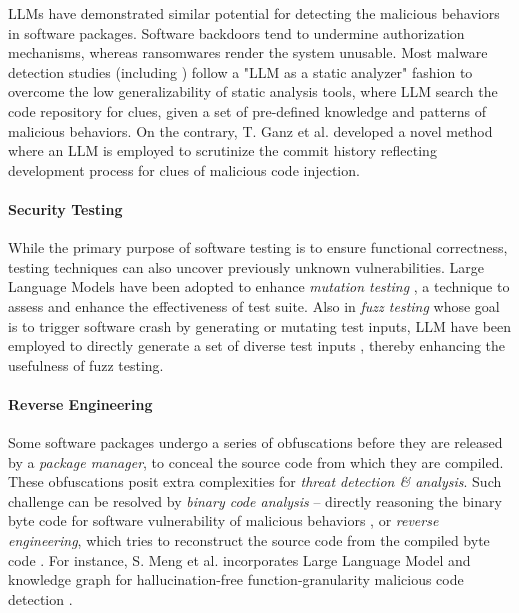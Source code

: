 \par LLMs have demonstrated similar potential for detecting the malicious behaviors
in software packages. Software backdoors tend to undermine authorization mechanisms,
whereas ransomwares render the system unusable. Most malware detection studies
(including \cite{10.1145/3705304, 10695665, 11029752})
follow a "LLM as a static analyzer" fashion to overcome the low generalizability
of static analysis tools, where LLM search the code repository
for clues, given a set of pre-defined knowledge and patterns of malicious behaviors.
On the contrary, T. Ganz et al. developed a novel method where an LLM is
employed to scrutinize the commit history reflecting development process for clues
of malicious code injection\citep{10.1145/3577923.3583657}.

\paragraph*{Security Testing}
While the primary purpose of software testing is to ensure functional correctness,
testing techniques can also uncover previously unknown vulnerabilities.
Large Language Models have been adopted to enhance \textit{mutation testing} 
\citep{10.1145/3756681.3756991}, a technique to assess and enhance the
effectiveness of test suite. Also in \textit{fuzz testing} whose goal
is to trigger software crash by generating or mutating test inputs,
LLM have been employed to directly generate a set of diverse test inputs
\citep{fuzz4all}, thereby enhancing the usefulness of fuzz testing. 

\paragraph*{Reverse Engineering}
Some software packages undergo a series of obfuscations before they are released
by a \textit{package manager}, to conceal the source code from which
they are compiled. These obfuscations posit extra complexities for
\textit{threat detection \& analysis}. Such challenge can be resolved
by \textit{binary code analysis} -- directly reasoning the binary byte code
for software vulnerability of malicious behaviors \citep{11519107}, 
or \textit{reverse engineering},
which tries to reconstruct the source code from the compiled byte code
\citep{YU2026104923}. For instance, S. Meng et al. incorporates Large Language Model
and knowledge graph for hallucination-free function-granularity malicious
code detection \citep{11519107}.

